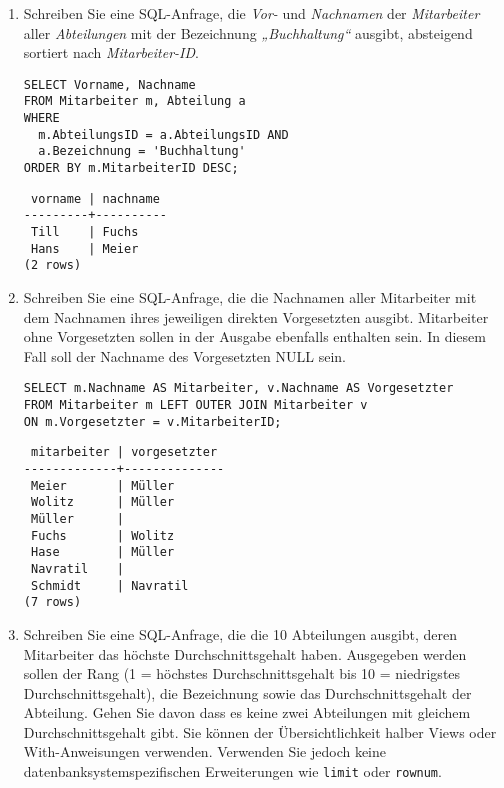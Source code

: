 \documentclass{bschlangaul-aufgabe}
\begin{document}
\begin{enumerate}


\item Schreiben Sie eine SQL-Anfrage, die \emph{Vor-} und
\emph{Nachnamen} der \emph{Mitarbeiter} aller \emph{Abteilungen} mit der
Bezeichnung \emph{„Buchhaltung“} ausgibt, absteigend sortiert nach
\emph{Mitarbeiter-ID}.

\begin{liAntwort}
\begin{verbatim}
SELECT Vorname, Nachname
FROM Mitarbeiter m, Abteilung a
WHERE
  m.AbteilungsID = a.AbteilungsID AND
  a.Bezeichnung = 'Buchhaltung'
ORDER BY m.MitarbeiterID DESC;
\end{verbatim}

\begin{verbatim}
 vorname | nachname
---------+----------
 Till    | Fuchs
 Hans    | Meier
(2 rows)
\end{verbatim}
\end{liAntwort}


\item Schreiben Sie eine SQL-Anfrage, die die Nachnamen aller
Mitarbeiter mit dem Nachnamen ihres jeweiligen direkten Vorgesetzten
ausgibt. Mitarbeiter ohne Vorgesetzten sollen in der Ausgabe ebenfalls
enthalten sein. In diesem Fall soll der Nachname des Vorgesetzten NULL
sein.

\begin{liAntwort}
\begin{verbatim}
SELECT m.Nachname AS Mitarbeiter, v.Nachname AS Vorgesetzter
FROM Mitarbeiter m LEFT OUTER JOIN Mitarbeiter v
ON m.Vorgesetzter = v.MitarbeiterID;
\end{verbatim}

\begin{verbatim}
 mitarbeiter | vorgesetzter
-------------+--------------
 Meier       | Müller
 Wolitz      | Müller
 Müller      |
 Fuchs       | Wolitz
 Hase        | Müller
 Navratil    |
 Schmidt     | Navratil
(7 rows)
\end{verbatim}
\end{liAntwort}


\item Schreiben Sie eine SQL-Anfrage, die die 10 Abteilungen ausgibt,
deren Mitarbeiter das höchste Durchschnittsgehalt haben. Ausgegeben
werden sollen der Rang (1 = höchstes Durchschnittsgehalt bis 10 =
niedrigstes Durchschnittsgehalt), die Bezeichnung sowie das
Durchschnittsgehalt der Abteilung. Gehen Sie davon dass es keine zwei
Abteilungen mit gleichem Durchschnittsgehalt gibt. Sie können der
Übersichtlichkeit halber Views oder With-Anweisungen verwenden.
Verwenden Sie jedoch keine datenbanksystemspezifischen Erweiterungen wie
\verb|limit| oder \verb|rownum|.


\end{enumerate}
\end{document}
